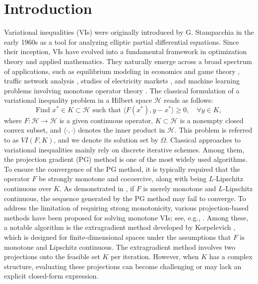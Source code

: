 \documentclass[hidelinks,11 pt]{article}
\numberwithin{equation}{section}
\theoremstyle{definition}  %
\numberwithin{equation}{section}
\numberwithin{theorem}{section}
\begin{document}
\section{Introduction}
\quad Variational inequalities (VIs) were originally introduced by G. Stampacchia in the early 1960s \cite{Stampacchia1964} as a tool for analyzing elliptic partial differential equations. Since their inception, VIs have evolved into a fundamental framework in optimization theory and applied mathematics.  
They naturally emerge across a broad spectrum of applications, such as equilibrium modeling in economics and game theory \cite{FacchineiPang2003}, traffic network analysis \cite{Nagurney1993}, studies of electricity markets \cite{Bertsekas1999}, and machine learning problems involving monotone operator theory \cite{BauschkeCombettes2011}.
\vskip 2mm
The classical formulation of a variational inequality problem in a Hilbert space \(\mathcal{H}\) reads as follows:
\begin{equation}\label{1.1}
    \text{Find } x^* \in K \subset\mathcal{H} \text{ such that } \langle F(x^*), y - x^* \rangle \geq 0, \quad \forall y \in K,
\end{equation}
where \( F: \mathcal{H} \to\mathcal{H}\) is a given continuous operator, \( K \subset\mathcal{H} \) is a nonempty closed convex subset, and \( \langle \cdot, \cdot \rangle \) denotes the inner product in \( \mathcal{H} \). This problem is referred to as \( VI(F, K) \), and we denote its solution set by \( \Omega \).
\vskip 2mm
Classical approaches to variational inequalities mainly rely on discrete iterative schemes. Among them, the projection gradient (PG) method \cite{a6} is one of the most widely used algorithms. To ensure the convergence of the PG method, it is typically required that the operator \( F \) be strongly monotone and cocoercive, along with being \( L \)-Lipschitz continuous over \( K \). As demonstrated in \cite{FacchineiPang2003}, if \( F \) is merely monotone and \( L \)-Lipschitz continuous, the sequence generated by the PG method may fail to converge.
\vskip 2mm
To address the limitation of requiring strong monotonicity, various projection-based methods have been proposed for solving monotone VIs; see, e.g., \cite{a7,a8,a9,a10,a11,a12}. Among these, a notable algorithm is the extragradient method developed by Korpelevich \cite{a11}, which is designed for finite-dimensional spaces under the assumptions that \( F \) is monotone and Lipschitz continuous. The extragradient method involves two projections onto the feasible set \( K \) per iteration. However, when \( K \) has a complex structure, evaluating these projections can become challenging or may lack an explicit closed-form expression.
\end{document}

